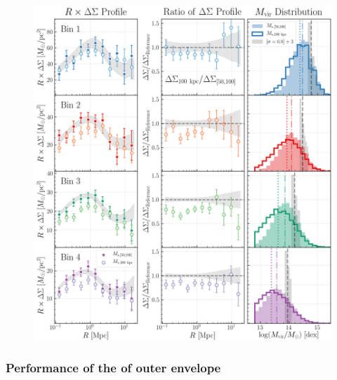 \documentclass[fleqn,usenatbib,useAMS,english]{mnras}
\begin{document}
  \begin{figure}
      \centering
      \includegraphics[width=\textwidth]{figure/topn_dsigma_m100_mout_compare}
      \caption{
          }
      \label{fig:m100_mout}
  \end{figure}

\subsubsection{Performance of the \mstar{} of outer envelope}
    \label{sec:moutskirt}
\end{document}

